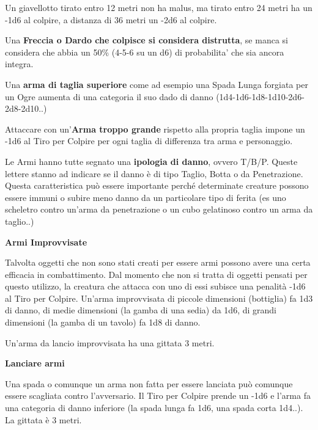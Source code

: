 \documentclass[a4paper,11pt,twoside,openany]{book}
\begin{document}
Un giavellotto tirato entro 12 metri non ha malus, ma tirato entro 24 metri ha un -1d6 al colpire, a distanza di 36 metri un -2d6 al colpire.

\medskip


Una \textbf{Freccia o Dardo che colpisce si considera distrutta}, se manca si considera che abbia un 50\% (4-5-6 su un d6) di probabilita' che sia ancora integra.

\medskip

Una \textbf{arma di taglia superiore}  come ad esempio una Spada Lunga forgiata per un Ogre aumenta di una categoria il suo dado di danno (1d4-1d6-1d8-1d10-2d6-2d8-2d10..)

\medskip

Attaccare con un'\textbf{Arma troppo grande} rispetto alla propria taglia impone un -1d6 al Tiro per Colpire per ogni taglia di differenza tra arma e personaggio.

\medskip

Le Armi hanno tutte segnato una \textbf{ipologia di danno}, ovvero T/B/P.
Queste lettere stanno ad indicare se il danno è di tipo Taglio, Botta o da Penetrazione. Questa caratteristica può essere importante perché 	determinate creature possono essere immuni o subire meno danno da un particolare tipo di ferita (es uno scheletro contro un'arma da penetrazione o un cubo gelatinoso contro un arma da taglio..)

\medskip

\textbf{Armi Improvvisate}

Talvolta oggetti che non sono stati creati per essere armi possono avere una certa efficacia in combattimento. Dal momento che non si tratta di oggetti pensati per questo utilizzo, la creatura che attacca con uno di essi subisce una penalità -1d6 al Tiro per Colpire. Un'arma improvvisata di piccole dimensioni (bottiglia) fa 1d3 di danno, di medie dimensioni (la gamba di una sedia) da 1d6, di grandi dimensioni (la gamba di un tavolo) fa 1d8 di danno.

Un'arma da lancio improvvisata ha una gittata 3 metri.

\medskip

\textbf{Lanciare armi}

Una spada o comunque un arma non fatta per essere lanciata può comunque essere scagliata contro l'avversario. Il Tiro per Colpire prende un -1d6 e l'arma fa una categoria di danno inferiore (la spada lunga fa 1d6, una spada corta 1d4..). La gittata è 3 metri.
\end{document}
